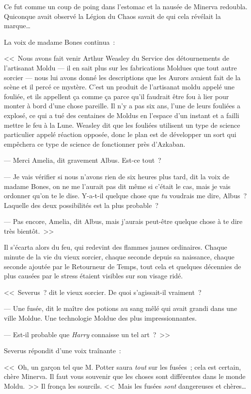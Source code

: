 Ce fut comme un coup de poing dans l'estomac et la nausée de Minerva redoubla. Quiconque avait observé la Légion du Chaos savait de qui cela révélait la marque…

La voix de madame Bones continua~:

<<~Nous avons fait venir Arthur Weasley du Service des détournements de l'artisanat Moldu — il en sait plus sur les fabrications Moldues que tout autre sorcier — nous lui avons donné les descriptions que les Aurors avaient fait de la scène et il percé ce mystère. C'est un produit de l'artisanat moldu appelé une fouliée, et ils appellent ça comme ça parce qu'il faudrait être fou à lier pour monter à bord d'une chose pareille. Il n'y a pas six ans, l'une de leurs fouliées a explosé, ce qui a tué des centaines de Moldus en l'espace d'un instant et a failli mettre le feu à la Lune. Weasley dit que les fouliées utilisent un type de science particulier appelé réaction opposée, donc le plan est de développer un sort qui empêchera ce type de science de fonctionner près d'Azkaban.

--- Merci Amelia, dit gravement Albus. Est-ce tout~?

--- Je vais vérifier si nous n'avons rien de six heures plus tard, dit la voix de madame Bones, on ne me l'aurait pas dit même si c'était le cas, mais je vais ordonner qu'on te le dise. Y-a-t-il quelque chose que \emph{tu} voudrais me dire, Albus~? Laquelle des deux possibilités est la plus probable~?

--- Pas encore, Amelia, dit Albus, mais j'aurais peut-être quelque chose à te dire très bientôt.~>>

Il s'écarta alors du feu, qui redevint des flammes jaunes ordinaires. Chaque minute de la vie du vieux sorcier, chaque seconde depuis sa naissance, chaque seconde ajoutée par le Retourneur de Temps, tout cela et quelques décennies de plus causées par le stress étaient visibles sur son visage ridé.

<<~Severus~? dit le vieux sorcier. De quoi s'agissait-il vraiment~?

--- Une fusée, dit le maître des potions au sang mêlé qui avait grandi dans une ville Moldue. Une technologie Moldue des plus impressionnantes.

--- Est-il probable que \emph{Harry} connaisse un tel art~?~>>

Severus répondit d'une voix traînante~:

<<~Oh, un garçon tel que M. Potter saura \emph{tout} sur les fusées~; cela est certain, chère Minerva. Il faut vous souvenir que les choses sont différentes dans le monde Moldu.~>> Il fronça les sourcils. <<~Mais les fusées \emph{sont} dangereuses et chères…

